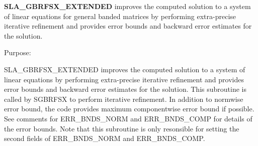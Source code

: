 {\bfseries S\+L\+A\+\_\+\+G\+B\+R\+F\+S\+X\+\_\+\+E\+X\+T\+E\+N\+D\+E\+D} improves the computed solution to a system of linear equations for general banded matrices by performing extra-\/precise iterative refinement and provides error bounds and backward error estimates for the solution. 

 \begin{DoxyParagraph}{Purpose\+: }
\begin{DoxyVerb} SLA_GBRFSX_EXTENDED improves the computed solution to a system of
 linear equations by performing extra-precise iterative refinement
 and provides error bounds and backward error estimates for the solution.
 This subroutine is called by SGBRFSX to perform iterative refinement.
 In addition to normwise error bound, the code provides maximum
 componentwise error bound if possible. See comments for ERR_BNDS_NORM
 and ERR_BNDS_COMP for details of the error bounds. Note that this
 subroutine is only resonsible for setting the second fields of
 ERR_BNDS_NORM and ERR_BNDS_COMP.\end{DoxyVerb}
 
\end{DoxyParagraph}

